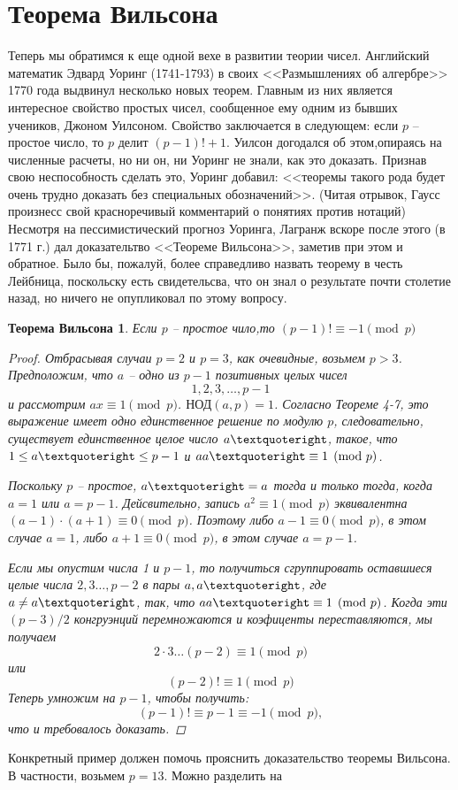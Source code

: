 \documentclass[4apaper,11pt]{article}
\newtheorem*{theorem}{Теорема Вильсона}
\begin{document}
\section{Теорема Вильсона}
Теперь мы обратимся к еще одной вехе в развитии теории чисел. Английский математик Эдвард Уоринг (1741-1793) в своих <<Размышлениях об алгербре>> 1770 года выдвинул несколько новых теорем. Главным из них является интересное свойство простых чисел, сообщенное ему одним из бывших учеников,  Джоном Уилсоном. Свойство заключается в следующем: если $p$ -- простое число, то $p$ делит $(p-1)!+1$. Уилсон догодался об этом,опираясь на численные расчеты, но ни он, ни Уоринг не знали, как это доказать. Признав свою неспособность сделать это, Уоринг добавил: <<теоремы такого рода будет очень трудно доказать без специальных обозначений>>. (Читая отрывок, Гаусс произнесс свой красноречивый комментарий о понятиях против нотаций)	Несмотря на пессимистический прогноз Уоринга, Лагранж вскоре после этого (в 1771 г.) дал доказательтво <<Теореме Вильсона>>, заметив при этом и обратное. Было бы, пожалуй, более справедливо назвать теорему в честь Лейбница, поскольску есть свидетельсва, что он знал о результате почти столетие назад, но ничего не опупликовал по этому вопросу.
\begin{theorem}
Если $p$ -- простое чило,то $(p-1)!\equiv -1\pmod p$	
	\begin{proof}
	Отбрасывая случаи $p=2$ и $p=3$, как очевидные, возьмем $p>3$. Предположим, что $a$ -- одно из $p-1$ позитивных целых чисел 
	\[1, 2, 3,\dots, p-1\]
	и рассмотрим $ax\equiv 1\pmod p$. $\text{НОД}(a,p)=1$. Согласно Теореме 4-7, это выражение имеет одно единственное решение по модулю $p$, следовательно, существует единственное целое число $a\textquoteright$, такое, что $1\leq a\textquoteright\leq p-1$ и $a a\textquoteright \equiv 1\pmod p$.
	
	Поскольку $p$ -- простое, $a\textquoteright=a$ тогда и только тогда, когда $a=1$ или $a=p-1$. Дейсвительно, запись $a^2\equiv 1\pmod p$ эквивалентна $(a-1)\cdot(a+1)\equiv 0\pmod p$. Поэтому либо $a-1\equiv 0\pmod p$,  в этом случае $a=1$, либо $a+1\equiv0\pmod p$, в этом случае $a=p-1$.
	
	Если мы опустим числа 1 и $p-1$, то получиться сгруппировать оставшиеся целые числа $2,3\dots,p-2$ в пары $a,a\textquoteright$, где $a\neq a\textquoteright$, так, что $aa\textquoteright\equiv 1\pmod p$. Когда эти $(p-3)/2$ конгруэнций перемножаются и коэфиценты переставляются, мы получаем
	\[2\cdot3\dots(p-2)\equiv 1\pmod p\] или
	\[(p-2)!\equiv 1\pmod p\]
	Теперь умножим на $p-1$, чтобы получить:
	\[(p-1)!\equiv p-1\equiv -1\pmod p,\] 
	что и требовалось доказать.
	\end{proof}
\end{theorem}
Конкретный пример должен помочь прояснить доказательство теоремы Вильсона. В частности, возьмем $p=13$. Можно разделить на 
\end{document}
